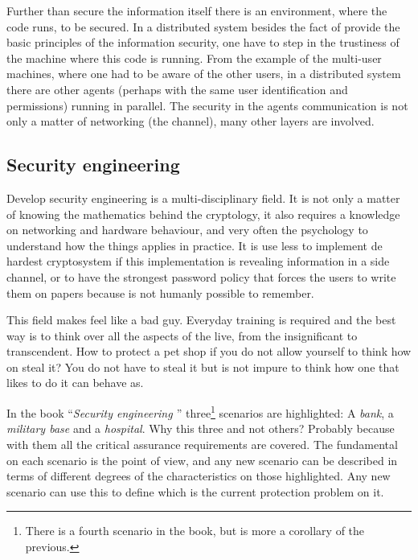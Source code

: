\documentclass[10pt,a4paper,twoside]{llncs}
\begin{document}
Further than secure the information itself there is an environment, where the code runs, to be secured. In a distributed system besides the fact of provide the basic principles of the information security, one have to step in the trustiness of the machine where this code is running. From the example of the multi-user machines, where one had to be aware of the other users, in a distributed system there are other agents (perhaps with the same user identification and permissions) running in parallel. The security in the agents communication is not only a matter of networking (the channel), many other layers are involved.

\subsection{Security engineering}\label{sec:SecurityEngineering}

Develop security engineering is a multi-disciplinary field. It is not only a matter of knowing the mathematics behind the cryptology, it also requires a knowledge on networking and hardware behaviour, and very often the psychology to understand how the things applies in practice. It is use less to implement de hardest cryptosystem if this implementation is revealing information in a side channel, or to have the strongest password policy that forces the users to write them on papers because is not humanly possible to remember.

This field makes feel like a bad guy. Everyday training is required and the best way is to think over all the aspects of the live, from the insignificant to transcendent. How to protect a pet shop if you do not allow yourself to think how on steal it? You do not have to steal it but is not impure to think how one that likes to do it can behave as.

In the book ``\emph{Security engineering \cite{SecEngRossAnderson}}'' three\footnote{There is a fourth scenario in the book, but is more a corollary of the previous.} scenarios are highlighted: A \emph{bank}, a \emph{military base} and a \emph{hospital}. Why this three and not others? Probably because with them all the critical assurance requirements are covered. The fundamental on each scenario is the point of view, and any new scenario can be described in terms of different degrees of the characteristics on those highlighted. Any new scenario can use this to define which is the current protection problem on it.
\end{document}
